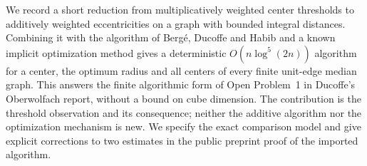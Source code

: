 
We record a short reduction from multiplicatively weighted center thresholds
to additively weighted eccentricities on a graph with bounded integral
distances. Combining it with the algorithm of Berg\'e, Ducoffe and Habib
and a known implicit optimization method gives a deterministic
$O(n\log^5(2n))$ algorithm for a center, the optimum radius and all centers
of every finite unit-edge median graph. This answers the finite algorithmic
form of Open Problem~1 in Ducoffe's Oberwolfach report, without a bound on
cube dimension. The contribution is the threshold observation and its
consequence; neither the additive algorithm nor the optimization mechanism
is new. We specify the exact comparison model and give explicit corrections
to two estimates in the public preprint proof of the imported algorithm.
